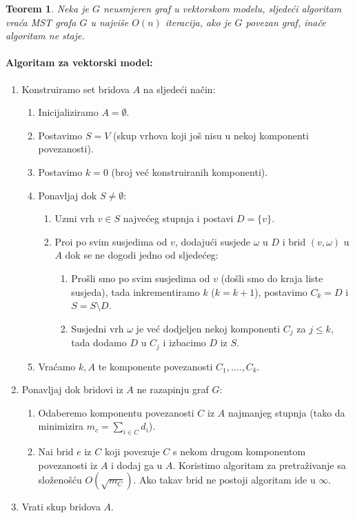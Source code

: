 \documentclass[a4paper,12pt]{article}
\newtheorem{tm}{Teorem}
\begin{document}
\begin{tm}
	Neka je $G$ neusmjeren graf u vektorskom modelu, sljede\'ci algoritam vra\'ca MST grafa $G$  u najvi\v{s}e $O(n)$ iteracija, ako je $G$ povezan graf, ina\v{c}e algoritam ne staje.
\end{tm}

\paragraph{Algoritam za vektorski model:}
\begin{enumerate}
	\item Konstruiramo set bridova $A$ na sljede\'ci na\v{c}in:
	\begin{enumerate}
		\item Inicijaliziramo $A =  \emptyset $.
		\item Postavimo $S = V$ (skup vrhova koji jo\v{s} nisu u nekoj komponenti povezanosti).
		\item Postavimo $k = 0$ (broj ve\'c konstruiranih komponenti).
		\item Ponavljaj dok $ S \ne \emptyset $:
		\begin{enumerate}
			\item Uzmi vrh $v \in S$ najve\'ceg stupnja i postavi $D = \{ v \} $.
			\item Pro\dj{}i po svim susjedima od $v$, dodaju\'ci susjede $ \omega $ u $D$ i brid $(v, \omega )$ u $A$ dok se ne dogodi jedno od sljede\'ceg:
			\begin{enumerate}
				\item Pro\v{s}li smo po svim susjedima od $v$ (do\v{s}li smo do kraja liste susjeda), tada inkrementiramo $k$ ($k = k+1$), postavimo $C_k = D$ i $S = S \setminus D$.
				\item Susjedni vrh $ \omega $ je ve\'c dodjeljen nekoj komponenti $C_j$ za $j \leq k$, tada dodamo $D$ u $C_j$ i izbacimo $D$ iz $S$.
			\end{enumerate}
		\end{enumerate}
		\item Vra\'camo $k, A$ te  komponente povezanosti  $C_1, ...., C_k$.
	\end{enumerate}
	\item Ponavljaj dok bridovi iz $A$ ne razapinju graf $G$:
	\begin{enumerate}
		\item Odaberemo komponentu povezanosti $C$ iz $A$ najmanjeg stupnja (tako da minimizira $ m_c = \sum_{i \in C} d_i$).
		\item Na\dj{}i brid $e$ iz $C$ koji povezuje $C$ s nekom drugom komponentom povezanosti iz $A$ i dodaj ga u $A$. Koristimo algoritam za pretra\v{z}ivanje sa slo\v{z}eno\v{s}\'cu $O(\sqrt{m_C})$. Ako takav brid ne postoji algoritam ide u $\infty$.
	\end{enumerate}
	\item Vrati skup bridova $A$.
\end{enumerate}
\end{document}
